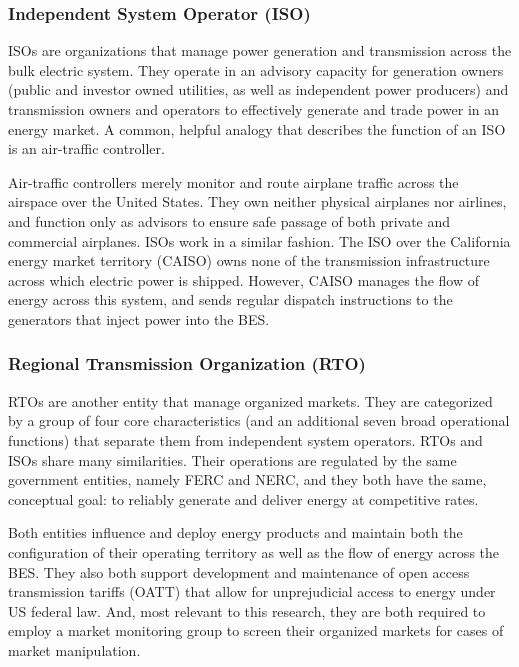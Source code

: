 \subsubsection{Independent System Operator (ISO)}

ISOs are organizations that manage power generation and transmission across the bulk electric system. They operate in an advisory capacity for generation owners (public and investor owned utilities, as well as independent power producers) and transmission owners and operators to effectively generate and trade power in an energy market. A common, helpful analogy that describes the function of an ISO is an air-traffic controller.

Air-traffic controllers merely monitor and route airplane traffic across the airspace over the United States. They own neither physical airplanes nor airlines, and function only as advisors to ensure safe passage of both private and commercial airplanes. ISOs work in a similar fashion. The ISO over the California energy market territory (CAISO) owns none of the transmission infrastructure across which electric power is shipped. However, CAISO manages the flow of energy across this system, and sends regular dispatch instructions to the generators that inject power into the BES.

\subsubsection{Regional Transmission Organization (RTO)}

RTOs are another entity that manage organized markets. They are categorized by a group of four core characteristics (and an additional seven broad operational functions) that separate them from independent system operators. RTOs and ISOs share many similarities. Their operations are regulated by the same government entities, namely FERC and NERC, and they both have the same, conceptual goal: to reliably generate and deliver energy at competitive rates. 

Both entities influence and deploy energy products and maintain both the configuration of their operating territory as well as the flow of energy across the BES. They also both support development and maintenance of open access transmission tariffs (OATT) that allow for unprejudicial access to energy under US federal law. And, most relevant to this research, they are both required to employ a market monitoring group to screen their organized markets for cases of market manipulation.

